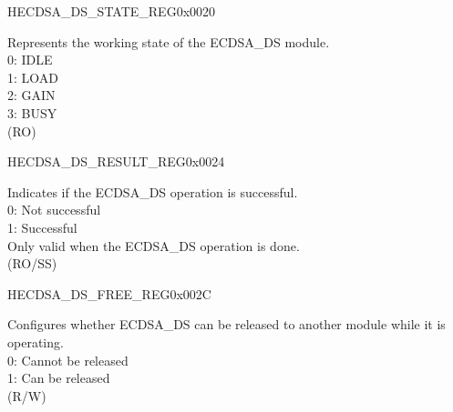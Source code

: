 \begin{register}{H}{ECDSA\_DS\_STATE\_REG}{0x0020}\label{regdesc:ECDSADSSTATEREG}
%
%
\regnewline%
\begin{regdesc}\begin{reglist}
\label{fielddesc:ECDSADSBUSY}\item [ECDSA\_DS\_BUSY] Represents the working state of the ECDSA\_DS module.\\
0: IDLE\\
1: LOAD\\
2: GAIN\\
3: BUSY\\
(RO)
\end{reglist}\end{regdesc}
\end{register}


\begin{register}{H}{ECDSA\_DS\_RESULT\_REG}{0x0024}\label{regdesc:ECDSADSRESULTREG}
%
%
\regnewline%
\begin{regdesc}\begin{reglist}
\label{fielddesc:ECDSADSOPERATIONRESULT}\item [ECDSA\_DS\_OPERATION\_RESULT] Indicates if the ECDSA\_DS operation is successful.\\
0: Not successful\\
1: Successful\\
Only valid when the ECDSA\_DS operation is done. \\
(RO/SS)
\end{reglist}\end{regdesc}
\end{register}


\begin{register}{H}{ECDSA\_DS\_FREE\_REG}{0x002C}\label{regdesc:ECDSADSFREEREG}
%
%
\regnewline%
\begin{regdesc}\begin{reglist}
\label{fielddesc:ECDSADSFREE}\item [ECDSA\_DS\_FREE] Configures whether ECDSA\_DS can be released to another module while it is operating.\\
0: Cannot be released\\
1: Can be released\\
 (R/W)
\end{reglist}\end{regdesc}
\end{register}


